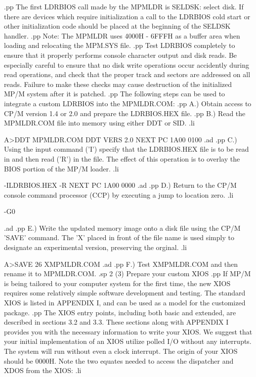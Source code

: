 .pp
The first LDRBIOS call made by the MPMLDR is SELDSK: select
disk.  If there are devices which require initialization a
call to the LDRBIOS cold start or other initialization code
should be placed at the beginning of the SELDSK handler.
.pp
Note:  The MPMLDR uses 4000H - 6FFFH as a buffer area  when
loading and relocating the MPM.SYS file.
.pp
Test LDRBIOS completely to ensure that it properly performs
console character output and disk reads.  Be especially
careful to ensure that no disk write operations occur accidently
during read operations, and check that the proper track and sectors
are addressed on all reads.  Failure to make these checks
may cause destruction of the initialized MP/M system after it is patched.
.pp
The following steps can be used to integrate a custom LDRBIOS
into the MPMLDR.COM:
.pp
A.)  Obtain access to CP/M version 1.4 or 2.0 and prepare the
LDRBIOS.HEX file.
.pp
B.)  Read the MPMLDR.COM file into memory using either DDT
or SID.
.li

               A>DDT MPMLDR.COM
               DDT VERS 2.0
               NEXT  PC
               1A00 0100
.ad
.pp
C.)  Using the input command ('I') specify that the LDRBIOS.HEX
file is to be read in and then read ('R') in the file.  The effect
of this operation is to overlay the BIOS portion of the MP/M
loader.
.li

               -ILDRBIOS.HEX
               -R
               NEXT  PC
               1A00 0000
.ad
.pp
D.)  Return to the CP/M console command processor (CCP) by
executing a jump to location zero.
.li

               -G0

.ad
.pp
E.)  Write the updated memory image onto a disk file using
the CP/M 'SAVE' command.  The 'X' placed in front of the file
name is used simply to designate an experimental version, preserving
the orginal.
.li

	       A>SAVE 26 XMPMLDR.COM
.ad
.pp
F.)  Test XMPMLDR.COM and then rename it to MPMLDR.COM.
.sp 2
(3)  Prepare your custom XIOS
.pp
If MP/M is being tailored to your computer system for the first
time,
the new XIOS requires some relatively simple software development and
testing.  The standard XIOS is listed in APPENDIX I, and can be used as
a model for the customized package.
.pp
The XIOS entry points, including both basic and extended, are described
in sections 3.2 and 3.3.  These sections along with APPENDIX I
provides you with the necessary information to write your XIOS.
We suggest that your initial implementation of an XIOS utilize polled
I/O without any interrupts.  The system will run without even a clock
interrupt.
The origin of your XIOS should be 0000H.  Note the two equates needed
to access the dispatcher and XDOS from the XIOS:
.li

